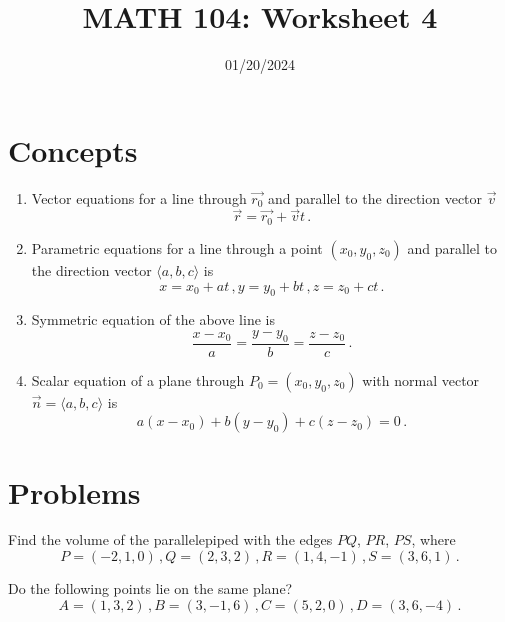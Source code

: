\documentclass[12pt]{amsart}
\title{ MATH 104: Worksheet 4}
\author{}
\date{01/20/2024}
\begin{document}
\maketitle

\section{Concepts}
\begin{enumerate}
	\item Vector equations for a line through  $\vec{ r_0 }$ and
	      parallel to the direction vector $\vec{v}$
	      \begin{equation*}
		      \vec{r} = \vec{r_0} + \vec{v} t \,.
	      \end{equation*}
	\item Parametric equations for a line through a point $(x_0, y_0, z_0)$ and
	      parallel to the direction vector $\langle a,b,c \rangle$
	      is
	      \begin{equation*}
		      x = x_0 + at \,, y = y_0 + bt \,, z = z_0 + ct \,.
	      \end{equation*}
	\item Symmetric equation of the above line is
	      \begin{equation*}
		      \frac{x - x_0}{a} = \frac{y - y_0}{b} = \frac{z - z_0}{c} \,.
	      \end{equation*}
	\item Scalar equation of a plane through $P_0 = (x_0, y_0, z_0)$ with normal
	      vector $\vec{n} = \langle a,b,c \rangle$ is
	      \begin{equation*}
		      a (x - x_0) + b (y - y_0) + c (z -z_0) = 0 \,.
	      \end{equation*}
\end{enumerate}
\section{Problems}

\begin{question}
	Find the volume of the parallelepiped with the edges $PQ$, $PR$, $PS$, where
	\begin{equation*}
		P =  (-2,1,0) \,, Q = (2,3,2) \,, R = (1,4,-1) \,, S = (3,6,1) \,.
	\end{equation*}
\end{question}
\vspace{5cm}

\begin{question}
	Do the following points lie on the same plane?
	\begin{equation*}
		A = (1,3,2) \,, B = (3,-1,6) \,, C = (5,2,0) \,, D = (3,6,-4) \,.
	\end{equation*}
\end{question}
\vspace{5cm}
\end{document}
